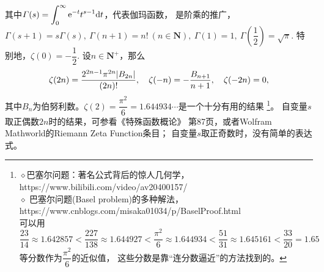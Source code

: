 \begin{itemize}[leftmargin=\inteval{\myitemleftmargin}pt,itemsep=
   \inteval{\myitemitempsep}pt,topsep=\inteval{\myitemtopsep}pt]
其中$ \displaystyle \Gamma(s)=\int_{0}^{\infty}\mathrm{e}^{-t}t^{s-1}\mathrm{d} t $，代表伽玛函数，
是阶乘的推广，$ \Gamma(s+1)=s\Gamma(s),\ \Gamma(n+1)=n!\ 
(n\in \textbf{N}),\  \Gamma(1)=1,\ \Gamma\left(\dfrac{1}{2}\right)=\sqrt{\pi} $. 
特别地，$ \zeta(0)=-\dfrac{1}{2} $. 设$ n\in \textbf{N}^+ $，那么
\begin{gather*}
    \zeta(2n)=\dfrac{2^{2n-1}\pi^{2n}|B_{2n}|}{(2n)!},\quad \zeta(-n)=-\dfrac{B_{n+1}}{n+1},\quad \zeta(-2n)=0,
\end{gather*}
其中$ B_n $为伯努利数。$ \zeta(2)=\dfrac{\pi^2}{6}=1.644934\cdots $是一个十分有用的结果
\footnote{$ \diamond $巴塞尔问题：著名公式背后的惊人几何学，
    https://www.bilibili.com/video/av20400157/ \\
    $ \diamond $ 巴塞尔问题(Basel problem)的多种解法，
    https://www.cnblogs.com/misaka01034/p/BaselProof.html \\
    可以用$ \dfrac{23}{14}\approx 1.642857<\dfrac{227}{138}
    \approx 1.644927<\dfrac{\pi^2}{6}\approx1.644934 <\dfrac{51}{31}\approx
    1.645161<\dfrac{33}{20}=1.65 $等分数作为$ \dfrac{\pi^2}{6} $的近似值，
    这些分数是靠“连分数逼近”的方法找到的。}。
自变量$ s $取正偶数$ 2n $时的结果，可参看《特殊函数概论》
第87页，或者Wolfram Mathworld的Riemann Zeta Function条目；
自变量$ s $取正奇数时，没有简单的表达式。


\end{itemize}
